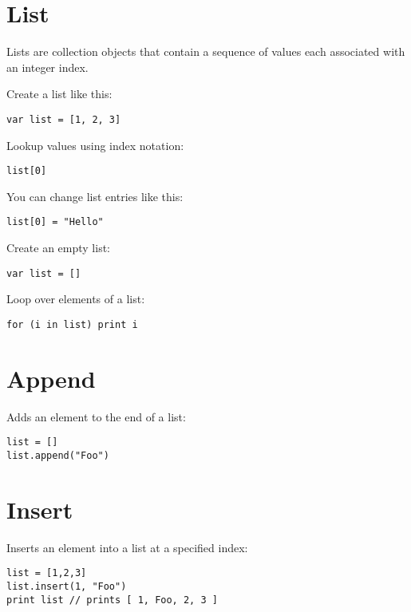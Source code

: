 \hypertarget{list}{%
\section{List}\label{list}}

Lists are collection objects that contain a sequence of values each
associated with an integer index.

Create a list like this:

\begin{lstlisting}
var list = [1, 2, 3]
\end{lstlisting}

Lookup values using index notation:

\begin{lstlisting}
list[0]
\end{lstlisting}

You can change list entries like this:

\begin{lstlisting}
list[0] = "Hello"
\end{lstlisting}

Create an empty list:

\begin{lstlisting}
var list = []
\end{lstlisting}

Loop over elements of a list:

\begin{lstlisting}
for (i in list) print i
\end{lstlisting}

\hypertarget{append}{%
\section{Append}\label{append}}

Adds an element to the end of a list:

\begin{lstlisting}
list = []
list.append("Foo")
\end{lstlisting}

\hypertarget{insert}{%
\section{Insert}\label{insert}}

Inserts an element into a list at a specified index:

\begin{lstlisting}
list = [1,2,3]
list.insert(1, "Foo")
print list // prints [ 1, Foo, 2, 3 ]
\end{lstlisting}

